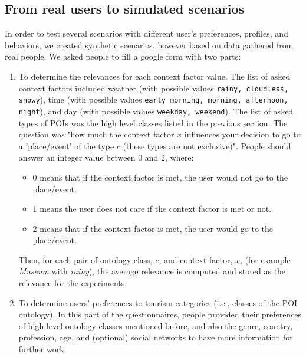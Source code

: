 \subsection{From real users to simulated scenarios}
\label{section:relevances-survey}

In order to test several scenarios with different user's preferences, profiles, and behaviors,  we created synthetic scenarios, however based on data gathered from real people.
We asked people to fill a google form with two parts: 

\begin{enumerate}
    \item To determine the relevances for each context factor value. The list of asked context factors included weather (with possible values {\tt rainy, cloudless, snowy}), time (with possible values {\tt early morning, morning, afternoon, night}), and day (with possible values {\tt weekday, weekend}). The list of asked types of POIs was the high level classes listed in the previous section. The question was     "how much the context factor $x$ influences your decision to go to a 'place/event' of the type $c$ (these types are not exclusive)". People should answer an integer value between $0$ and $2$, where: 
\begin{itemize}
    \item $0$ means that if the context factor 
    is met, the user
    would not go to the place/event.
    \item 1 means the user does
    not care if the context factor is met or not.
    \item 2 means that if the context factor is met, 
    the user would go to the place/event.
\end{itemize}

Then, for each pair of ontology class, $c$, and context factor, $x$, %
(for example \textit{Museum} with \textit{rainy}), the average relevance is computed and stored as the relevance for the experiments.


 \item To determine users' preferences to tourism categories (i.e., classes of the POI ontology). In this part of the questionnaires, people provided their preferences  of high level ontology classes mentioned before, and also the genre, country, profession, age, and (optional) social networks to have more information for further work.
 
\end{enumerate}
    
